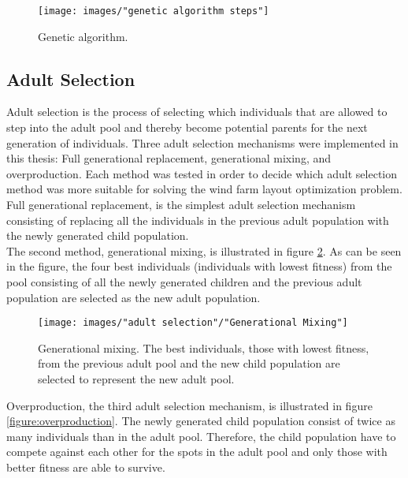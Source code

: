 \documentclass{article}
\begin{document}
\begin{figure}[h!]
\begin{center}
\texttt{[image: images/"genetic algorithm steps"]}
\caption{Genetic algorithm.}
\label{figure:genetic algorithm steps}
\end{center}
\end{figure}


\subsection{Adult Selection}\label{subsection:adult selection}
Adult selection is the process of selecting which individuals that are allowed to step into the adult pool and thereby become potential parents for the next generation of individuals. Three adult selection mechanisms were implemented in this thesis: Full generational replacement,  generational mixing, and overproduction. Each method was tested in order to decide which adult selection method was more suitable for solving the wind farm layout optimization problem. \\

\noindent Full generational replacement, is the simplest adult selection mechanism consisting of replacing all the individuals in the previous adult population with the newly generated child population. \\

\noindent The second method, generational mixing, is illustrated in figure \ref{figure:generational mixing}. As can be seen in the figure, the four best individuals (individuals with lowest fitness) from the pool consisting of all the newly generated children and the previous adult population are selected as the new adult population. \\


\begin{figure}[h!]
\begin{center}
\texttt{[image: images/"adult selection"/"Generational Mixing"]}
\caption{Generational mixing. The best individuals, those with lowest fitness, from the previous adult pool and the new child population are selected to represent the new adult pool.}
\label{figure:generational mixing}
\end{center}
\end{figure}


\noindent Overproduction, the third adult selection mechanism, is illustrated in figure \ref{figure:overproduction}. The newly generated child population consist of twice as many individuals than in the adult pool. Therefore, the child population have to compete against each other for the spots in the adult pool and only those with better fitness are able to survive. \\
\end{document}
